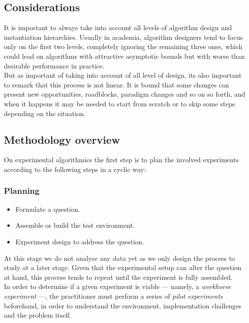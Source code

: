 \subsection{Considerations}
\label{SUBSECTION:EXPERIMENTAL_ALGORITMICS_CONSIDERATIONS}

It is important to always take into account all levels of algorithm design and instantiation hierarchies. Usually in academia, algorithm designers tend to focus only on the first two levels, completely ignoring the remaining three ones, which could lead on algorithms with attractive asymptotic bounds but with worse than desirable performance in practice.\\

But as important of taking into account of all level of design, its also important to remark that this process is not linear. It is bound that some changes can present new opportunities, roadblocks, paradigm changes and so on so forth, and when it happens it may be needed to start from scratch or to skip some steps depending on the situation.\\


\subsection{Methodology overview}

On experimental algorithmics the first step is to plan the involved experiments according to the following steps in a cyclic way:\\

\subsubsection{Planning}
\begin{itemize}
    \item Formulate a question.
    \item Assemble or build the test environment.
    \item Experiment design to address the question.
\end{itemize}

At this stage we do not analyse any data yet as we only design the process to study at a later stage. Given that the experimental setup can alter the question at hand, this process tends to repeat until the experiment is fully assembled.\\

In order to determine if a given experiment is viable --- namely, a \emph{workhorse experiment} ---, the practitioner must perform a series of \emph{pilot experiments} beforehand, in order to understand the environment, implementation challenges and the problem itself. \\

